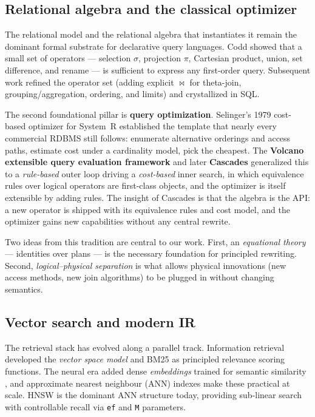 \documentclass[sigconf,nonacm,review]{acmart}
\theoremstyle{plain}
\theoremstyle{definition}
\theoremstyle{remark}
\begin{document}
\subsection{Relational algebra and the classical optimizer}

The relational model \cite{codd1970} and the relational algebra that
instantiates it remain the dominant formal substrate for declarative
query languages. Codd showed that a small set of operators ---
selection $\sigma$, projection $\pi$, Cartesian product, union, set
difference, and rename --- is sufficient to express any first-order
query. Subsequent work refined the operator set (adding explicit
$\bowtie$ for theta-join, grouping/aggregation, ordering, and limits)
and crystallized in SQL.

The second foundational pillar is \textbf{query optimization}.
Selinger's 1979 cost-based optimizer for System~R
\cite{selinger1979} established the template that nearly every
commercial RDBMS still follows: enumerate alternative orderings and
access paths, estimate cost under a cardinality model, pick the
cheapest. The \textbf{Volcano extensible query evaluation framework}
\cite{graefe1994} and later \textbf{Cascades} \cite{graefe1995}
generalized this to a \emph{rule-based} outer loop driving a
\emph{cost-based} inner search, in which equivalence rules over
logical operators are first-class objects, and the optimizer is itself
extensible by adding rules. The insight of Cascades is that the
algebra is the API: a new operator is shipped with its equivalence
rules and cost model, and the optimizer gains new capabilities
without any central rewrite.

Two ideas from this tradition are central to our work. First, an
\emph{equational theory} --- identities over plans --- is the
necessary foundation for principled rewriting. Second,
\emph{logical--physical separation} is what allows physical
innovations (new access methods, new join algorithms) to be plugged
in without changing semantics.

\subsection{Vector search and modern IR}

The retrieval stack has evolved along a parallel track. Information
retrieval developed the \emph{vector space model} \cite{salton1975}
and BM25 \cite{bm25} as principled relevance scoring functions. The
neural era added dense \emph{embeddings} trained for semantic
similarity \cite{mikolov2013,reimers2019}, and approximate nearest
neighbour (ANN) indexes make these practical at scale. HNSW
\cite{hnsw} is the dominant ANN structure today, providing sub-linear
search with controllable recall via \texttt{ef} and \texttt{M}
parameters.
\end{document}
